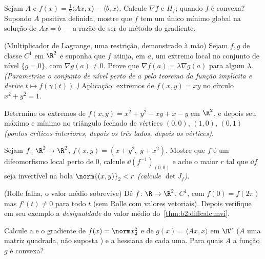 \begin{exercise}[$\star\star$]\label{exo:b2:diffcalc:5}
Sejam $A$  e $f(x) = \frac12\langle Ax, x\rangle -
\langle b, x\rangle$. Calcule $\nabla f$ e $H_f$; quando $f$ é
convexa? Supondo $A$ positiva definida, mostre que $f$ tem um único
mínimo global na solução de $Ax = b$ --- a razão de ser do
método do gradiente.
\end{exercise}

\begin{exercise}[$\star\star$]\label{exo:b2:diffcalc:6}
(Multiplicador de Lagrange, uma restrição, demonstrado à mão) Sejam $f, g$
de classe $C^1$ em $\R^2$ e suponha que $f$ atinja, em $a$, um extremo local
no conjunto de nível $\{g = 0\}$, com $\nabla g(a) \neq 0$. Prove que
$\nabla f(a) = \lambda\nabla g(a)$ para algum $\lambda$.
\emph{(Parametrize o conjunto de nível perto de $a$ pelo teorema da função
implícita e derive $t \mapsto f(\gamma(t))$.)} Aplicação:
extremos de $f(x,y) = xy$ no círculo $x^2 + y^2 = 1$.
\end{exercise}

\begin{exercise}[$\star\star$]\label{exo:b2:diffcalc:7}
Determine os extremos de $f(x, y) = x^2 + y^2 - xy + x - y$ em
$\R^2$, e depois seu máximo e mínimo no triângulo fechado de
vértices $(0,0)$, $(1,0)$, $(0,1)$ \emph{(pontos críticos interiores,
depois os três lados, depois os vértices)}.
\end{exercise}

\begin{exercise}[$\star\star\star$]\label{exo:b2:diffcalc:8}
Sejam $f \colon \R^2 \to \R^2$, $f(x, y) = (x + y^2,\; y + x^2)$.
Mostre que $f$ é um difeomorfismo local perto de $0$, calcule
$\dd(f^{-1})_{(0,0)}$ e ache o maior $r$ tal que $\dd f$
seja invertível na bola $\norm{(x,y)}_2 < r$ \emph{(calcule
$\det J_f$)}.
\end{exercise}

\begin{exercise}[$\star\star\star$]\label{exo:b2:diffcalc:9}
(Rolle falha, o valor médio sobrevive) Dê $f \colon \R \to \R^2$,
$C^1$, com $f(0) = f(2\pi)$ mas $f'(t) \neq 0$ para todo $t$
(sem Rolle com valores vetoriais). Depois verifique em seu exemplo a
\emph{desigualdade} do valor médio do~\cref{thm:b2:diffcalc:mvi}.
\end{exercise}

\begin{exercise}[$\star$]\label{exo:b2:diffcalc:10}
Calcule a  e o gradiente de $f(x) = \norm
x_2^2$ e de $g(x) = \langle Ax, x\rangle$ em $\R^n$ ($A$ uma
matriz quadrada, não suposta ) e a hessiana de cada uma.
Para quais $A$ a função $g$ é convexa?
\end{exercise}

